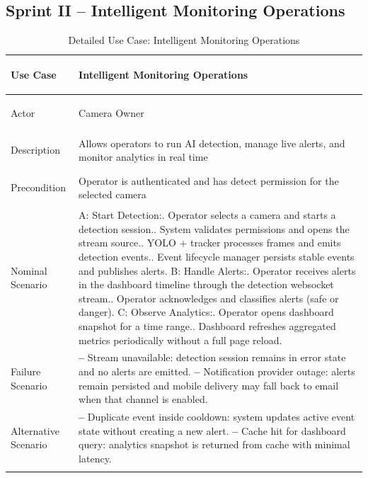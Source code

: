 \documentclass[12pt,a4paper,oneside]{report}
\newlength{\TblTwoKeyW}
\newlength{\TblTwoValW}
\begin{document}
\subsection*{Sprint II -- Intelligent Monitoring Operations}
{\small
\begin{longtable}{|>{\bfseries\raggedright\arraybackslash}p{\TblTwoKeyW}|>{\raggedright\arraybackslash}p{\TblTwoValW}|}
\hline
Use Case    & Intelligent Monitoring Operations \\ \hline
Actor       & Camera Owner \\ \hline
Description & Allows operators to run AI detection, manage live alerts, and monitor analytics in real time \\ \hline
Precondition & Operator is authenticated and has detect permission for the selected camera \\ \hline
Nominal Scenario &
A: Start Detection:\newline
1. Operator selects a camera and starts a detection session.\newline
2. System validates permissions and opens the stream source.\newline
3. YOLO + tracker processes frames and emits detection events.\newline
4. Event lifecycle manager persists stable events and publishes alerts.\newline
B: Handle Alerts:\newline
1. Operator receives alerts in the dashboard timeline through the detection websocket stream.\newline
2. Operator acknowledges and classifies alerts (safe or danger).\newline
C: Observe Analytics:\newline
1. Operator opens dashboard snapshot for a time range.\newline
2. Dashboard refreshes aggregated metrics periodically without a full page reload. \\ \hline
Failure Scenario &
\textbf{--} Stream unavailable: detection session remains in error state and no alerts are emitted.\newline
\textbf{--} Notification provider outage: alerts remain persisted and mobile delivery may fall back to email when that channel is enabled. \\ \hline
Alternative Scenario &
\textbf{--} Duplicate event inside cooldown: system updates active event state without creating a new alert.\newline
\textbf{--} Cache hit for dashboard query: analytics snapshot is returned from cache with minimal latency. \\ \hline
\caption{Detailed Use Case: Intelligent Monitoring Operations}
\label{tab:app_uc_s2_monitoring}
\end{longtable}
}
\end{document}
